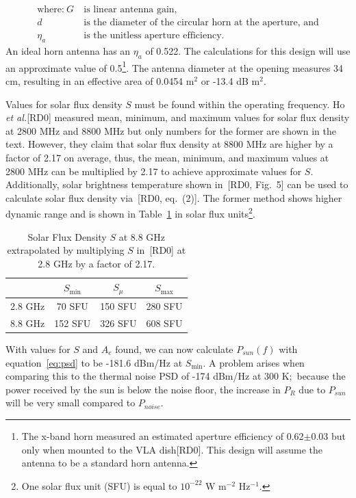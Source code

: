 \documentclass[titlepage]{article}
\newcommand{\nraocite}[1]{[RD0\cite{#1}]}
\newcommand{\nraoprecite}[2][]{[RD0\cite{#2}{, #1}]}
\begin{document}
\begin{align*} 
    \text{where:}~G ~&\text{is linear antenna gain,}\\
           d        ~&\text{is the diameter of the circular horn at the aperture, and}\\
           \eta_a   ~&\text{is the unitless aperture efficiency.}
\end{align*}
An ideal horn antenna has an $\eta_a$ of 0.522. The calculations for this design will use an approximate value of 0.5\footnote{The x-band horn measured an estimated aperture efficiency of 0.62$\pm$0.03 but only when mounted to the VLA dish\nraocite{xbandvla}. This design will assume the antenna to be a standard horn antenna.}. The antenna diameter at the opening measures 34 cm, resulting in an effective area of 0.0454 m$^2$ or -13.4 dB m$^2$.

Values for solar flux density $S$ must be found within the operating frequency. Ho \textit{et al.}\nraocite{solartemp} measured mean, minimum, and maximum values for solar flux density at 2800 MHz and 8800 MHz but only numbers for the former are shown in the text. However, they claim that solar flux density at 8800 MHz are higher by a factor of 2.17 on average, thus, the mean, minimum, and maximum values at 2800 MHz can be multiplied by 2.17 to achieve approximate values for $S$. Additionally, solar brightness temperature shown in~\nraoprecite[Fig.~5]{solartemp} can be used to calculate solar flux density via~\nraoprecite[eq.~(2)]{solartemp}. The former method shows higher dynamic range and is shown in Table~\ref{tab:sfd} in solar flux units\footnote{One solar flux unit (SFU) is equal to $10^{-22}$ W m$^{-2}$ Hz$^{-1}$.}.
\begin{table}[!ht]
\centering
\begin{tabular}{c|c|c|c}
    & $S_{\min}$ & $S_{\mu}$ & $S_{\max}$ \\ \hline
    2.8 GHz & 70 SFU & 150 SFU & 280 SFU \\
    8.8 GHz & 152 SFU & 326 SFU & 608 SFU
\end{tabular}
\caption{Solar Flux Density $S$ at 8.8 GHz extrapolated by multiplying $S$ in~\nraocite{solartemp} at 2.8 GHz by a factor of 2.17.} \label{tab:sfd}
\end{table}

With values for $S$ and $A_e$ found, we can now calculate $P_{sun}(f)$ with equation~\ref{eq:psd} to be -181.6 dBm/Hz at $S_{\min}$. A problem arises when comparing this to the thermal noise PSD of -174 dBm/Hz at 300 K;\ because the power received by the sun is below the noise floor, the increase in $P_R$ due to $P_{sun}$ will be very small compared to $P_{noise}$.
\end{document}
